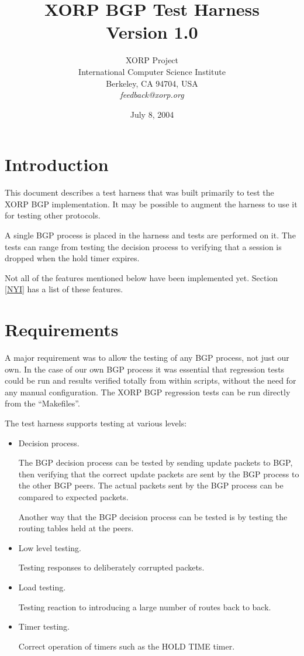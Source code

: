 \documentclass[11pt]{article}
\title{XORP BGP Test Harness \\
\vspace{1ex}
Version 1.0}
\author{ XORP Project                                   \\
         International Computer Science Institute       \\
         Berkeley, CA 94704, USA                        \\
         {\it feedback@xorp.org}
}
\date{July 8, 2004}
\begin{document}
\maketitle

\section{Introduction}

This document describes a test harness that was built primarily to
test the XORP BGP implementation. It may be possible to augment the
harness to use it for testing other protocols.

A single BGP process is placed in the harness and tests
are performed on it. The tests can range from testing the decision
process to verifying that a session is dropped when the hold timer expires.

Not all of the features mentioned below have been implemented yet.
Section \ref{NYI} has a list of these features.

\section{Requirements}

A major requirement was to allow the testing of any BGP process, not
just our own. In the case of our own BGP process it was essential that
regression tests could be run and results verified totally from within
scripts, without the need for any manual configuration. The
XORP BGP regression tests can be run directly from the ``Makefiles''.
\newline

The test harness supports testing at various levels:

\begin{itemize}
\item Decision process.

  The BGP decision process can be tested by sending update packets to
  BGP, then verifying that the correct update packets are sent by the
  BGP process to the other BGP peers. The actual packets sent by the
  BGP process can be compared to expected packets. 

  Another way that the BGP decision process can be tested is by
  testing the routing tables held at the peers.

\item Low level testing.

 Testing responses to deliberately corrupted packets.

\item Load testing. 

  Testing reaction to introducing a large number of routes back
  to back.

\item Timer testing.

  Correct operation of timers such as the HOLD TIME timer.

\end{itemize}
\end{document}
